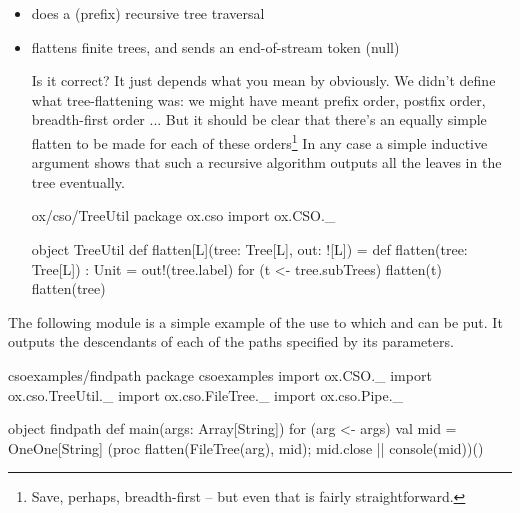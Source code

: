 \documentclass{concdistfoils}
\begin{document}
\begin{slide}
\begin{itemize}
\item {} does a (prefix) recursive tree traversal
\item {} flattens finite trees, and sends an end-of-stream token (null)
\begin{note}
Is it correct? It just depends what you mean by obviously. We didn't define what
tree-flattening was: we might have meant prefix order, postfix order,
breadth-first order ... But it should be clear that there's an equally
simple flatten to be made for each of these orders\footnote{Save,
perhaps, breadth-first -- but even that is fairly straightforward.}
In any case a simple inductive argument shows that such a recursive
algorithm outputs all the leaves in the tree eventually.
\end{note}
\vfill
\begin{obj}{ox/cso/TreeUtil}
package ox.cso
import  ox.CSO._
\end{obj}
\begin{obj}{}
object TreeUtil
{ def flatten[L](tree: Tree[L], out: ![L]) = 
  { def flatten(tree: Tree[L]) : Unit = 
    { out!(tree.label)
      for (t <- tree.subTrees) flatten(t)
    }    
    flatten(tree) 
  }
}
\end{obj}
\end{itemize}
\begin{note}
The following module is a simple example of the use to which
 and  can be put. It outputs the
descendants of each of the paths specified by its parameters.
\begin{obj}{csoexamples/findpath}
package csoexamples
import  ox.CSO._
import  ox.cso.TreeUtil._
import  ox.cso.FileTree._
import  ox.cso.Pipe._

object findpath
{     
  def main(args: Array[String])
  { 
    for (arg <- args)
    { val mid = OneOne[String]
      (proc { flatten(FileTree(arg), mid); mid.close } || console(mid))()     
    }
  }
}
\end{obj}
\end{note}
\end{slide}
\end{document}
